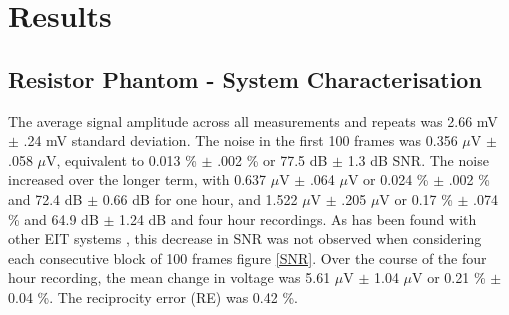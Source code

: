 \section{Results}
\subsection{Resistor Phantom - System Characterisation}
The average signal amplitude across all measurements and repeats was 2.66 mV $\pm$ .24 mV standard deviation. The noise in the first 100 frames was 0.356 $\mu$V $\pm$ .058 $\mu$V, equivalent to 0.013 \% $\pm$ .002 \% or 77.5 dB $\pm$ 1.3 dB SNR. The noise increased over the longer term, with 0.637 $\mu$V $\pm$ .064 $\mu$V or 0.024 \% $\pm$ .002 \% and 72.4 dB $\pm$ 0.66 dB for one hour, and 1.522 $\mu$V $\pm$ .205 $\mu$V or 0.17 \% $\pm$ .074 \% and 64.9 dB $\pm$ 1.24 dB and four hour recordings. As has been found with other EIT systems \cite{oh2007multi}, this decrease in SNR was not observed when considering each  consecutive block of 100 frames figure \ref{SNR}. Over the course of the four hour recording, the mean change in voltage was 5.61 $\mu$V $\pm$ 1.04 $\mu$V or 0.21 \% $\pm$ 0.04 \%. The reciprocity error (RE) was 0.42 \%. 
